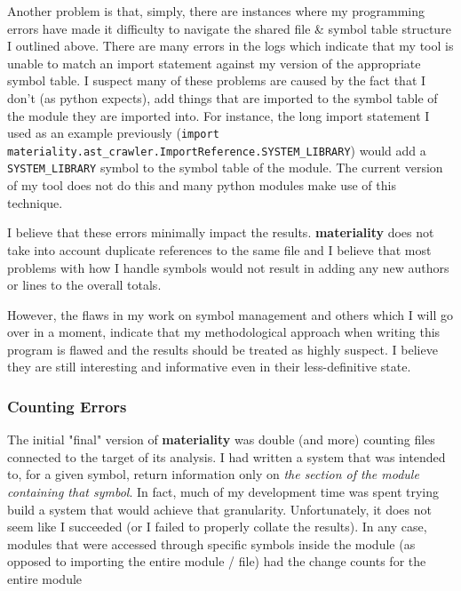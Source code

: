 \documentclass[a4paper,man,natbib,floatsintext]{apa6}
\begin{document}

  Another problem is that, simply, there are instances where my programming errors have made it difficulty to navigate the shared file \& symbol table structure I outlined above. There are many errors in the logs which indicate that my tool is unable to match an import statement against my version of the appropriate symbol table. I suspect many of these problems are caused by the fact that I don't (as \Gls{python} expects), add things that are imported to the symbol table of the module they are imported into. For instance, the long import statement I used as an example previously (\verb|import materiality.ast_crawler.ImportReference.SYSTEM_LIBRARY|) would add a \verb|SYSTEM_LIBRARY| symbol to the symbol table of the module. The current version of my tool does not do this and many \Gls{python} modules make use of this technique.

  I believe that these errors minimally impact the results. \textbf{materiality} does not take into account duplicate references to the same file and I believe that most problems with how I handle symbols would not result in adding any new authors or lines to the overall totals. 

  However, the flaws in my work on symbol management and others which I will go over in a moment, indicate that my methodological approach when writing this program is flawed and the results should be treated as highly suspect. I believe they are still interesting and informative even in their less-definitive state. 

  \subsubsection{Counting Errors}
  The initial "final" version of \textbf{materiality} was double (and more) counting files connected to the target of its analysis. I had written a system that was intended to, for a given symbol, return information only on \textit{the section of the module containing that symbol}. In fact, much of my development time was spent trying build a system that would achieve that granularity. Unfortunately, it does not seem like I succeeded (or I failed to properly collate the results). In any case, modules that were accessed through specific symbols inside the module (as opposed to importing the entire module / file) had the change counts for the entire module
\end{document}
